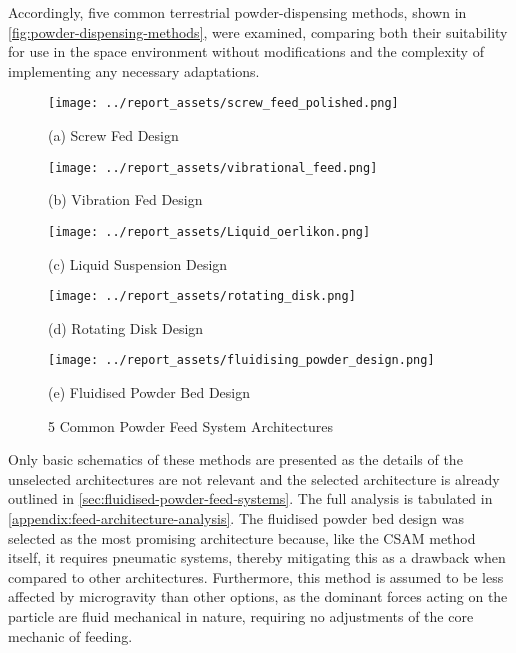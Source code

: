Accordingly, five common terrestrial powder-dispensing methods, shown in \autoref{fig:powder-dispensing-methods}, were examined, comparing both their suitability for use in the space environment without modifications and the complexity of implementing any necessary adaptations. 
\begin{figure}[htbp]
    \centering

    \begin{minipage}{0.3\textwidth}
        \centering
        \texttt{[image: ../report\_assets/screw\_feed\_polished.png]}
        \caption*{(a) Screw Fed Design~\cite{Bitragunta2015}}
    \end{minipage}
    \hfill
    \begin{minipage}{0.3\textwidth}
        \centering
        \texttt{[image: ../report\_assets/vibrational\_feed.png]}
        \caption*{(b) Vibration Fed Design~\cite{Sinclair2021}}
    \end{minipage}
    \hfill
    \begin{minipage}{0.3\textwidth}
        \centering
        \texttt{[image: ../report\_assets/Liquid\_oerlikon.png]}
        \caption*{(c) Liquid Suspension Design~\cite{OerlikonMetcoFeeders2023}}
    \end{minipage}
    \begin{minipage}{0.35\textwidth}
        \centering
        \texttt{[image: ../report\_assets/rotating\_disk.png]}
        \caption*{(d) Rotating Disk Design~\cite{Crawmer2013}}
    \end{minipage}
    \hspace{0.1\textwidth}
    \begin{minipage}{0.35\textwidth}
        \centering
        \texttt{[image: ../report\_assets/fluidising\_powder\_design.png]}
        \caption*{(e) Fluidised Powder Bed Design~\cite{Li2016}}
    \end{minipage}
    
    \caption{5 Common Powder Feed System Architectures}\label{fig:powder-dispensing-methods}
\end{figure}
Only basic schematics of these methods are presented as the details of the unselected architectures are not relevant and the selected architecture is already outlined in \autoref{sec:fluidised-powder-feed-systems}. The full analysis is tabulated in \autoref{appendix:feed-architecture-analysis}. The fluidised powder bed design was selected as the most promising architecture because, like the CSAM method itself, it requires pneumatic systems, thereby mitigating this as a drawback when compared to other architectures. Furthermore, this method is assumed to be less affected by microgravity than other options, as the dominant forces acting on the particle are fluid mechanical in nature, requiring no adjustments of the core mechanic of feeding. 

